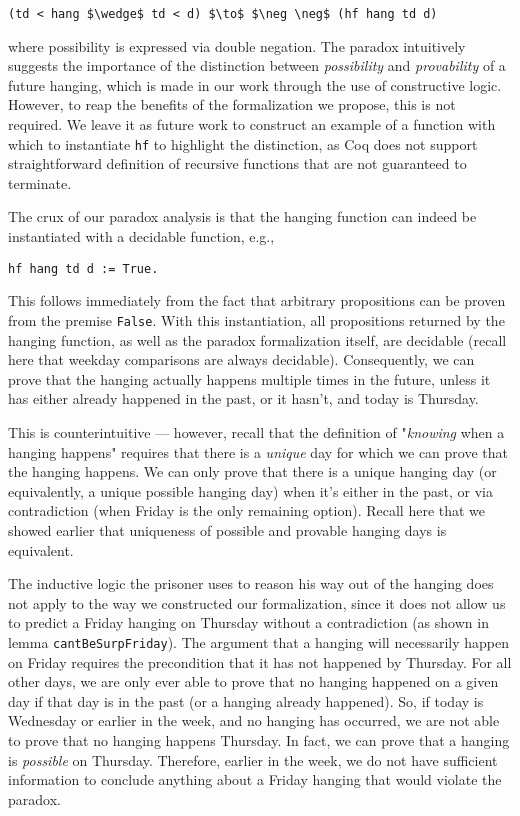 \documentclass[runningheads]{llncs}
\begin{document}
\begin{lstlisting}[mathescape=true]
    (td < hang $\wedge$ td < d) $\to$ $\neg \neg$ (hf hang td d)
\end{lstlisting}

where possibility is expressed via double negation. The paradox intuitively
suggests the importance of the distinction between \emph{possibility} and \emph{provability}
of a future hanging, which is made in our work through the use of constructive
logic. However, to reap the benefits of the formalization we propose, this is
not required.
We leave it as future work to construct an example of a
function with which to instantiate {\tt hf} to highlight the distinction,
as Coq does not support straightforward definition of recursive functions that are
not guaranteed to terminate.

The crux of our paradox analysis
is that the hanging function can indeed be instantiated with a decidable
function, e.g.,

\begin{lstlisting}[mathescape=true]
    hf hang td d := True.
\end{lstlisting}

This follows immediately from the fact that arbitrary propositions can be proven
from the premise {\tt False}. With this instantiation, all propositions
returned by the hanging function, as well as the paradox formalization itself,
are decidable (recall here that weekday comparisons are always decidable).
Consequently, we can prove that the hanging actually happens
multiple times in the future, unless it has either already happened in the past,
or it hasn't, and today is Thursday.

This is counterintuitive --- however, recall that the
definition of "\emph{knowing} when a hanging happens" requires that there
is a \emph{unique}
day for which we can prove that the hanging happens. We can only prove that
there is a unique hanging day (or equivalently, a unique possible hanging day)
when it's either in the past, or via contradiction (when Friday is the only remaining option).
Recall here that we showed earlier that uniqueness of possible and provable
hanging days is equivalent.

The inductive logic the prisoner uses to reason his way out of the hanging does
not apply to the way we constructed our formalization, since it does not
allow us to predict a Friday hanging on Thursday without a contradiction
(as shown in lemma {\tt cantBeSurpFriday}).
The argument that a hanging will necessarily happen on Friday requires the
precondition that it has not happened by Thursday. For all other days,
we are only ever able to prove
that no hanging happened on a given day if that day is in the past (or a hanging
already happened). So, if today is Wednesday or earlier
in the week, and no hanging has occurred, we are not able to prove that no hanging
happens Thursday. In fact, we can prove that a hanging is \emph{possible} on Thursday.
Therefore, earlier in the week, we do not have sufficient
information to conclude
anything about a Friday hanging that would violate the paradox.
\end{document}
